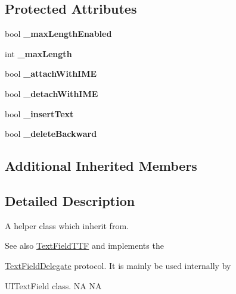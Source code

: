\subsection*{Protected Attributes}
\begin{DoxyCompactItemize}
\item 
\mbox{\label{classui_1_1UICCTextField_a2c0c7370c3696b9fbd6958c1d47f4ae4}} 
bool {\bfseries \+\_\+max\+Length\+Enabled}
\item 
\mbox{\label{classui_1_1UICCTextField_a907c95893bbe5f2f5c14144b3e1a1599}} 
int {\bfseries \+\_\+max\+Length}
\item 
\mbox{\label{classui_1_1UICCTextField_a66d2a183fa6cac6138f11100874aa273}} 
bool {\bfseries \+\_\+attach\+With\+I\+ME}
\item 
\mbox{\label{classui_1_1UICCTextField_ac620827b67290ed8c401a3d92a7b106b}} 
bool {\bfseries \+\_\+detach\+With\+I\+ME}
\item 
\mbox{\label{classui_1_1UICCTextField_ae88964cbb3bbefebdd7cca99ef102d4e}} 
bool {\bfseries \+\_\+insert\+Text}
\item 
\mbox{\label{classui_1_1UICCTextField_a05a296e75e816b3ea78c0dcb15cb88f7}} 
bool {\bfseries \+\_\+delete\+Backward}
\end{DoxyCompactItemize}
\subsection*{Additional Inherited Members}


\subsection{Detailed Description}
A helper class which inherit from. 

\begin{DoxySeeAlso}{See also}
{\ttfamily \hyperlink{classTextFieldTTF}{Text\+Field\+T\+TF}} and implements the 

{\ttfamily \hyperlink{classTextFieldDelegate}{Text\+Field\+Delegate}} protocol. It is mainly be used internally by 

{\ttfamily U\+I\+Text\+Field} class.  NA  NA 
\end{DoxySeeAlso}


